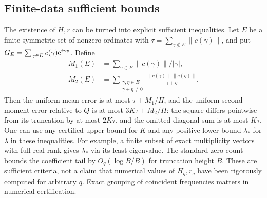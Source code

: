 \documentclass[11pt]{article}
\theoremstyle{remark}\newtheorem{remark}[theorem]{Remark}
\begin{document}
\subsection{Finite-data sufficient bounds}
The existence of $H,r$ can be turned into explicit sufficient inequalities. Let $E$ be a finite symmetric set of nonzero ordinates with $\tau=\sum_{\gamma\notin E}\|c(\gamma)\|$, and put $G_E=\sum_{\gamma\in E}c(\gamma)\mathrm e^{i\gamma v}$. Define
\begin{align*}
 M_1(E)&=\sum_{\gamma\in E}\|c(\gamma)\|/|\gamma|,\\
 M_2(E)&=\sum_{\substack{\gamma,\eta\in E\\\gamma+\eta\ne0}}
     \frac{\|c(\gamma)\|\,\|c(\eta)\|}{|\gamma+\eta|}.
\end{align*}
Then the uniform mean error is at most $\tau+M_1/H$, and the uniform second-moment error relative to $Q$ is at most $3K\tau+M_2/H$: the square differs pointwise from its truncation by at most $2K\tau$, and the omitted diagonal sum is at most $K\tau$. One can use any certified upper bound for $K$ and any positive lower bound $\lambda_*$ for $\lambda$ in these inequalities. For example, a finite subset of exact multiplicity vectors with full real rank gives $\lambda_*$ via its least eigenvalue. The standard zero count bounds the coefficient tail by $O_q(\log B/B)$ for truncation height $B$. These are sufficient criteria, not a claim that numerical values of $H_q,r_q$ have been rigorously computed for arbitrary $q$. Exact grouping of coincident frequencies matters in numerical certification.
\end{document}

